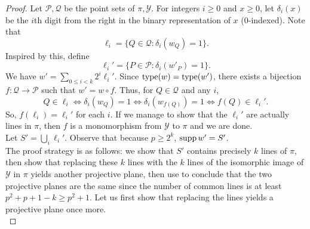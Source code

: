 	\begin{proof}
		Let $\mathcal{P},\mathcal{Q}$ be the point sets of $\pi,\mathcal{Y}$. For integers $i \ge 0$ and $x \ge 0$, let $\delta_i(x)$ be the $i$th digit from the right in the binary representation of $x$ ($0$-indexed). Note that
		\[ \ell_i = \{ Q \in \mathcal{Q} : \delta_i(w_Q) = 1 \}. \]
		Inspired by this, define
		\[ \ell_i' = \{ P \in \mathcal{P} : \delta_i(w'_P) = 1 \}. \]
		We have $w' = \sum_{0 \le i < k} 2^i \ell_i'$. Since $\operatorname{type}(w) = \operatorname{type}(w')$, there exists a bijection $f : \mathcal{Q} \to \mathcal{P}$ such that $w' = w \circ f$. Thus, for $Q \in \mathcal{Q}$ and any $i$,
		\[ Q \in \ell_i \iff \delta_i(w_Q) = 1 \iff \delta_i(w_{f(Q)}) = 1 \iff f(Q) \in \ell_i'. \]
		So, $f(\ell_i) = \ell_i'$ for each $i$. If we manage to show that the $\ell_i'$ are actually lines in $\pi$, then $f$ is a monomorphism from $\mathcal{Y}$ to $\pi$ and we are done.\\
		Let $S' = \bigcup_{i} \ell_i'$. Observe that because $p \ge 2^k$, $\operatorname{supp} w' = S'$.\\
		The proof strategy is as follows: we show that $S'$ contains precisely $k$ lines of $\pi$, then show that replacing these $k$ lines with the $k$ lines of the isomorphic image of $\mathcal{Y}$ in $\pi$ yields another projective plane, then use  to conclude that the two projective planes are the same since the number of common lines is at least $p^2+p+1-k \ge p^2+1$. Let us first show that replacing the lines yields a projective plane once more.\\


\end{proof}
